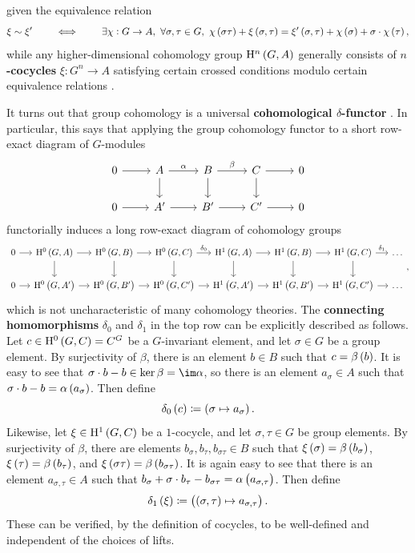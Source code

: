 \pagebreak

\noindent
given the equivalence relation
$$ \xi \sim \xi' \qquad \iff \qquad \exists \chi : G \to A, \ \forall \sigma, \tau \in G, \ \chi\br{\sigma\tau} + \xi\br{\sigma, \tau} = \xi'\br{\sigma, \tau} + \chi\br{\sigma} + \sigma \cdot \chi\br{\tau}, $$
while any higher-dimensional cohomology group $ \H^n\br{G, A} $ generally consists of \textbf{$ n $-cocycles} $ \xi : G^n \to A $ satisfying certain crossed conditions modulo certain equivalence relations \cite[Section VII.3]{Ser80}.

It turns out that group cohomology is a universal \textbf{cohomological $ \delta $-functor} \cite[Section VII.2]{Ser80}. In particular, this says that applying the group cohomology functor to a short row-exact diagram of $ G $-modules
$$
\begin{tikzcd}
0 \arrow{r} & A \arrow{r}{\alpha} \arrow{d} & B \arrow{r}{\beta} \arrow{d} & C \arrow{r} \arrow{d} & 0 \\
0 \arrow{r} & A' \arrow{r} & B' \arrow{r} & C' \arrow{r} & 0
\end{tikzcd}
$$
functorially induces a long row-exact diagram of cohomology groups
$$
\begin{tikzcd}[column sep=small]
0 \arrow{r} & \H^0\br{G, A} \arrow{r} \arrow{d} & \H^0\br{G, B} \arrow{r} \arrow{d} & \H^0\br{G, C} \arrow{r}{\delta_0} \arrow{d} & \H^1\br{G, A} \arrow{r} \arrow{d} & \H^1\br{G, B} \arrow{r} \arrow{d} & \H^1\br{G, C} \arrow{r}{\delta_1} \arrow{d} & \dots \\
0 \arrow{r} & \H^0\br{G, A'} \arrow{r} & \H^0\br{G, B'} \arrow{r} & \H^0\br{G, C'} \arrow{r} & \H^1\br{G, A'} \arrow{r} & \H^1\br{G, B'} \arrow{r} & \H^1\br{G, C'} \arrow{r} & \dots
\end{tikzcd},
$$
which is not uncharacteristic of many cohomology theories. The \textbf{connecting homomorphisms} $ \delta_0 $ and $ \delta_1 $ in the top row can be explicitly described as follows. Let $ c \in \H^0\br{G, C} = C^G $ be a $ G $-invariant element, and let $ \sigma \in G $ be a group element. By surjectivity of $ \beta $, there is an element $ b \in B $ such that $ c = \beta\br{b} $. It is easy to see that $ \sigma \cdot b - b \in \ker \beta = \im \alpha $, so there is an element $ a_\sigma \in A $ such that $ \sigma \cdot b - b = \alpha\br{a_\sigma} $. Then define
$$ \delta_0\br{c} \coloneqq \br{\sigma \mapsto a_\sigma}. $$
Likewise, let $ \xi \in \H^1\br{G, C} $ be a $ 1 $-cocycle, and let $ \sigma, \tau \in G $ be group elements. By surjectivity of $ \beta $, there are elements $ b_\sigma, b_\tau, b_{\sigma\tau} \in B $ such that $ \xi\br{\sigma} = \beta\br{b_\sigma} $, $ \xi\br{\tau} = \beta\br{b_\tau} $, and $ \xi\br{\sigma\tau} = \beta\br{b_{\sigma\tau}} $. It is again easy to see that there is an element $ a_{\sigma, \tau} \in A $ such that $ b_\sigma + \sigma \cdot b_\tau - b_{\sigma\tau} = \alpha\br{a_{\sigma, \tau}} $. Then define
$$ \delta_1\br{\xi} \coloneqq \br{\br{\sigma, \tau} \mapsto a_{\sigma, \tau}}. $$
These can be verified, by the definition of cocycles, to be well-defined and independent of the choices of lifts.

